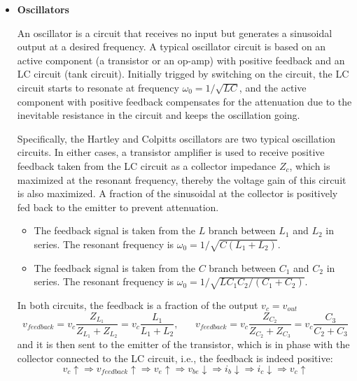 \documentclass{article}
\begin{document}
\begin{itemize}
\item {\bf Oscillators}

  An oscillator is a circuit that receives no input but generates a sinusoidal 
  output at a desired frequency. A typical oscillator circuit is based on an
  active component (a transistor or an op-amp) with positive feedback and an 
  LC circuit (tank circuit). Initially trigged by switching on the circuit, 
  the LC circuit starts to resonate at frequency $\omega_0=1/\sqrt{LC}$, and 
  the active component with positive feedback compensates for the attenuation 
  due to the inevitable resistance in the circuit and keeps the oscillation 
  going.

  Specifically, the Hartley and Colpitts oscillators are two typical oscillation
  circuits. In either cases, a transistor amplifier is used to receive positive 
  feedback taken from the LC circuit as a collector impedance $Z_c$, which is 
  maximized at the resonant frequency, thereby the voltage gain of this circuit 
  is also maximized. A fraction of the sinusoidal at the collector is positively 
  fed back to the emitter to prevent attenuation.
  
  \begin{itemize}
  \item {}
    The feedback signal is taken from the $L$ branch between $L_1$ and $L_2$ in series.
    The resonant frequency is $\omega_0=1/\sqrt{C(L_1+L_2)}$.


  \item {}
    The feedback signal is taken from the $C$ branch between $C_1$ and $C_2$ in series.
    The resonant frequency is $\omega_0=1/\sqrt{LC_1C_2/(C_1+C_2)}$.

  \end{itemize}
  In both circuits, the feedback is a fraction of the output $v_c=v_{out}$
  \begin{equation}
  v_{feedback}=v_c\frac{Z_{L_1}}{Z_{L_1}+{Z_{L_2}}}=v_c\frac{L_1}{L_1+L_2},\;\;\;\;\;\;
  v_{feedback}=v_c\frac{Z_{C_2}}{Z_{C_2}+{Z_{C_3}}}=v_c\frac{C_3}{C_2+C_3}
  \end{equation}
  and it is then sent to the emitter of the transistor, which is in phase with the 
  collector connected to the LC circuit, i.e., the feedback is indeed positive:
  \begin{equation}
  v_c\uparrow \Longrightarrow v_{feedback} \uparrow \Longrightarrow 
  v_e\uparrow \Longrightarrow v_{be} \downarrow 
  \Longrightarrow i_b\downarrow  \Longrightarrow i_c\downarrow
  \Longrightarrow v_c\uparrow
  \end{equation}


\end{itemize}
\end{document}
